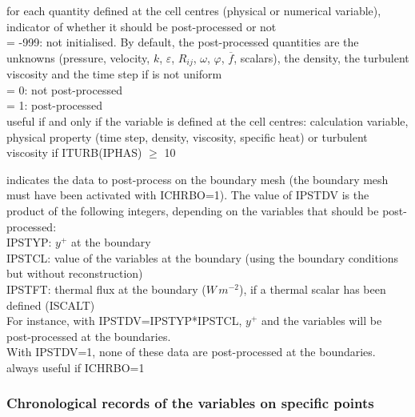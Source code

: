 {for each quantity defined at the cell centres (physical or numerical
variable), indicator of whether it should be post-processed or not \\ 
\hspace*{1.3cm}= -999: not initialised. By default, the post-processed
quantities are the unknowns (pressure, velocity, $k$, $\varepsilon$,
$R_{ij}$, $\omega$, $\varphi$, $\overline{f}$, scalars), the density,
the turbulent viscosity and the time step if is not uniform\\
\hspace*{1.3cm}= 0: not post-processed\\
\hspace*{1.3cm}= 1: post-processed\\
useful if and only if the variable is defined at the cell centres: 
calculation variable, physical property (time step, density,
viscosity, specific heat) or turbulent viscosity if ITURB(IPHAS)
$\geqslant$ 10} 

{indicates the data to post-process on the boundary mesh (the boundary mesh must
have been activated with ICHRBO=1). The value of IPSTDV is
the product of the following integers, depending on the variables that should be
post-processed:\\
\hspace*{1.3cm}IPSTYP: $y^+$ at the boundary\\
\hspace*{1.3cm}IPSTCL: value of the variables at the
boundary (using the boundary conditions but without reconstruction)\\ 
\hspace*{1.3cm}IPSTFT: thermal flux at the boundary
($W\,m^{-2}$), if a thermal scalar has been defined (ISCALT)\\ 
For instance, with IPSTDV=IPSTYP*IPSTCL, $y^+$ and the variables will be
post-processed at the boundaries.\\
With IPSTDV=1, none of these data are post-processed at the boundaries.\\
always useful if ICHRBO=1}

\subsubsection{Chronological records of the variables on specific points}

